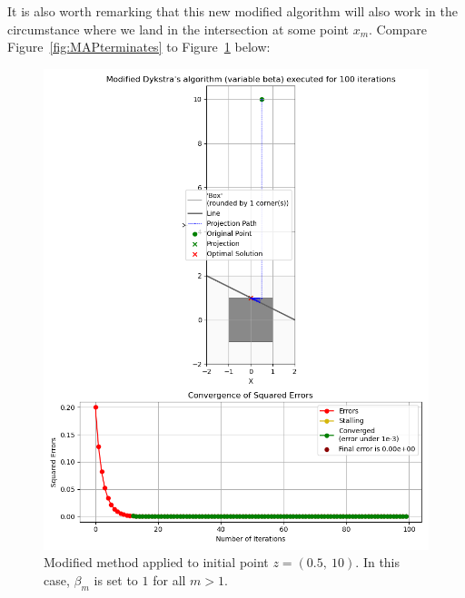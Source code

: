 \documentclass[hidelinks]{article}
\begin{document}
%
\newpage
It is also worth remarking that this new modified algorithm will also work in the circumstance where we land in the intersection at some point $x_m$. Compare Figure~\ref{fig:MAPterminates} to Figure~\ref{fig:noTermination} below:
%
\begin{figure}[h!]
    \centering
    
    \includegraphics[width=1\textwidth]{in_intersection_modified.png}
    \caption{Modified method applied to initial point $z = (0.5,~10)$. In this case, $\beta_m$ is set to $1$ for all $m > 1$.}
    \label{fig:noTermination}

\end{figure}
%
\end{document}
